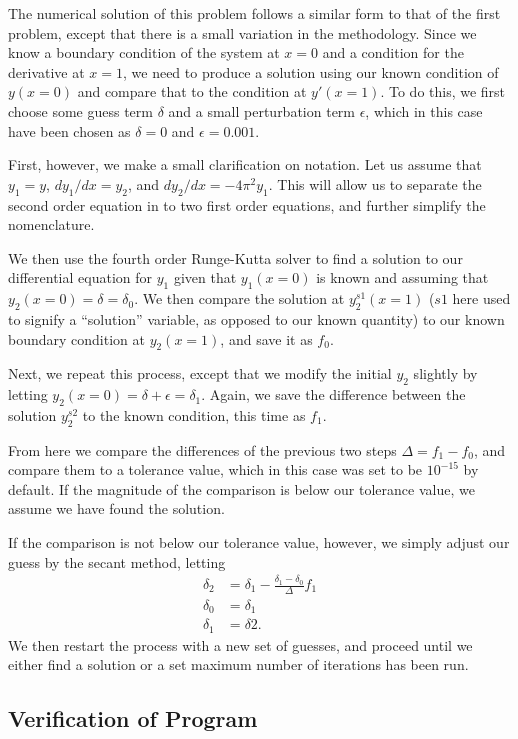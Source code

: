 \documentclass[10pt,letter]{article}
\begin{document}
The numerical solution of this problem follows a similar form to that of the first problem, except that there is a small variation in the methodology. Since we know a boundary condition of the system at $x=0$ and a condition for the derivative at $x=1$, we need to produce a solution using our known condition of $y(x=0)$ and compare that to the condition at $y'(x=1)$. To do this, we first choose some guess term $\delta$ and a small perturbation term $\epsilon$, which in this case have been chosen as $\delta = 0$ and $\epsilon = 0.001$.

First, however, we make a small clarification on notation. Let us assume that $y_1 = y$, $dy_1/dx = y_2$, and $dy_2/dx = -4\pi^2y_1$. This will allow us to separate the second order equation in to two first order equations, and further simplify the nomenclature.

We then use the fourth order Runge-Kutta solver to find a solution to our differential equation for $y_1$ given that $y_1(x=0)$ is known and assuming that $y_2(x=0) = \delta = \delta_0$. We then compare the solution at $y^{s1}_{2}(x=1)$ ($s1$ here used to signify a ``solution'' variable, as opposed to our known quantity) to our known boundary condition at $y_2(x=1)$, and save it as $f_0$.

Next, we repeat this process, except that we modify the initial $y_2$ slightly by letting $y_2(x=0) = \delta+\epsilon= \delta_1$. Again, we save the difference between the solution $y^{s2}_2$ to the known condition, this time as $f_1$.

From here we compare the differences of the previous two steps $\Delta = f_1 - f_0$, and compare them to a tolerance value, which in this case was set to be $10^{-15}$ by default. If the magnitude of the comparison is below our tolerance value, we assume we have found the solution.

If the comparison is not below our tolerance value, however, we simply adjust our guess by the secant method, letting
\begin{align}
\delta_2 &= \delta_1 - \frac{\delta_1-\delta_0}{\Delta}f_1 \\
\delta_0 &= \delta_1 \\
\delta_1 &= \delta 2.
\end{align}
We then restart the process with a new set of guesses, and proceed until we either find a solution or a set maximum number of iterations has been run.




\subsection{Verification of Program}
\end{document}
